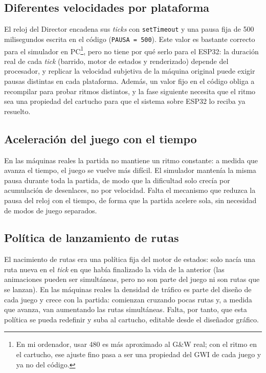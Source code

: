 \subsection{Diferentes velocidades por plataforma}

El reloj del Director encadena sus \textit{ticks} con
\texttt{setTimeout} y una pausa fija de 500 milisegundos escrita en el
código (\texttt{PAUSA = 500}). Este valor es bastante correcto para el
simulador en PC\footnote{En mi ordenador, usar 480 es más aproximado
	al G\&W real; con el ritmo en el cartucho, ese ajuste fino pasa a ser
	una propiedad del GWI de cada juego y ya no del código.}, pero no
tiene por qué serlo para el ESP32: la duración real de cada
\textit{tick} (barrido, motor de estados y renderizado) depende del
procesador, y replicar la velocidad subjetiva de la máquina original
puede exigir pausas distintas en cada plataforma. Además, un valor
fijo en el código obliga a recompilar para probar ritmos distintos, y
la fase siguiente necesita que el ritmo sea una propiedad del
cartucho para que el sistema sobre ESP32 lo reciba ya resuelto.

\subsection{Aceleración del juego con el tiempo}

En las máquinas reales la partida no mantiene un ritmo constante: a
medida que avanza el tiempo, el juego se vuelve más difícil. El
simulador mantenía la misma pausa durante toda la partida, de modo
que la dificultad solo crecía por acumulación de desenlaces, no por
velocidad. Falta el mecanismo que reduzca la pausa del reloj con el
tiempo, de forma que la partida acelere sola, sin necesidad de modos
de juego separados.

\subsection{Política de lanzamiento de rutas}

El nacimiento de rutas era una política fija del motor de estados:
solo nacía una ruta nueva en el \textit{tick} en que había finalizado
la vida de la anterior (las animaciones pueden ser simultáneas, pero
no son parte del juego ni son rutas que se lanzan). En las máquinas
reales la densidad de tráfico es parte del diseño de cada juego y
crece con la partida: comienzan cruzando pocas rutas y, a medida que
avanza, van aumentando las rutas simultáneas. Falta, por tanto, que
esta política se pueda redefinir y suba al cartucho, editable desde
el diseñador gráfico.

